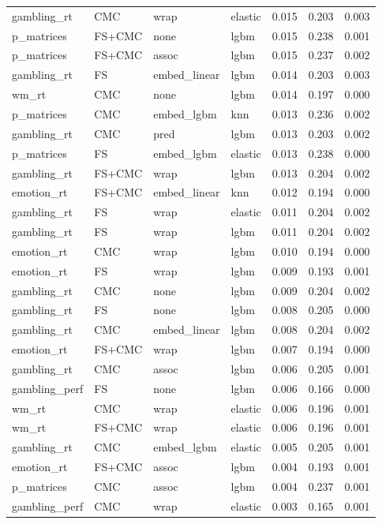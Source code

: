\documentclass{article}
\begin{document}
\begin{table}
\begin{tabular}{llllrrr}
	gambling\_rt & CMC & wrap & elastic & 0.015 & 0.203 & 0.003 \\
	p\_matrices & FS+CMC & none & lgbm & 0.015 & 0.238 & 0.001 \\
	p\_matrices & FS+CMC & assoc & lgbm & 0.015 & 0.237 & 0.002 \\
	gambling\_rt & FS & embed\_linear & lgbm & 0.014 & 0.203 & 0.003 \\
	wm\_rt & CMC & none & lgbm & 0.014 & 0.197 & 0.000 \\
	p\_matrices & CMC & embed\_lgbm & knn & 0.013 & 0.236 & 0.002 \\
	gambling\_rt & CMC & pred & lgbm & 0.013 & 0.203 & 0.002 \\
	p\_matrices & FS & embed\_lgbm & elastic & 0.013 & 0.238 & 0.000 \\
	gambling\_rt & FS+CMC & wrap & lgbm & 0.013 & 0.204 & 0.002 \\
	emotion\_rt & FS+CMC & embed\_linear & knn & 0.012 & 0.194 & 0.000 \\
	gambling\_rt & FS & wrap & elastic & 0.011 & 0.204 & 0.002 \\
	gambling\_rt & FS & wrap & lgbm & 0.011 & 0.204 & 0.002 \\
	emotion\_rt & CMC & wrap & lgbm & 0.010 & 0.194 & 0.000 \\
	emotion\_rt & FS & wrap & lgbm & 0.009 & 0.193 & 0.001 \\
	gambling\_rt & CMC & none & lgbm & 0.009 & 0.204 & 0.002 \\
	gambling\_rt & FS & none & lgbm & 0.008 & 0.205 & 0.000 \\
	gambling\_rt & CMC & embed\_linear & lgbm & 0.008 & 0.204 & 0.002 \\
	emotion\_rt & FS+CMC & wrap & lgbm & 0.007 & 0.194 & 0.000 \\
	gambling\_rt & CMC & assoc & lgbm & 0.006 & 0.205 & 0.001 \\
	gambling\_perf & FS & none & lgbm & 0.006 & 0.166 & 0.000 \\
	wm\_rt & CMC & wrap & elastic & 0.006 & 0.196 & 0.001 \\
	wm\_rt & FS+CMC & wrap & elastic & 0.006 & 0.196 & 0.001 \\
	gambling\_rt & CMC & embed\_lgbm & elastic & 0.005 & 0.205 & 0.001 \\
	emotion\_rt & FS+CMC & assoc & lgbm & 0.004 & 0.193 & 0.001 \\
	p\_matrices & CMC & assoc & lgbm & 0.004 & 0.237 & 0.001 \\
	gambling\_perf & CMC & wrap & elastic & 0.003 & 0.165 & 0.001 \\

\end{tabular}
\end{table}
\end{document}
